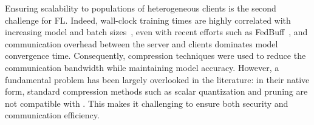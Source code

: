 Ensuring scalability to populations of heterogeneous clients is the second challenge for FL.
Indeed, wall-clock training times are highly correlated with increasing model and batch sizes~\citep{huba2021papaya}, even with recent efforts such as FedBuff~\citep{nguyen2021federated},
and communication overhead between the server and clients dominates model convergence time.
Consequently, compression techniques were used to reduce the communication bandwidth while maintaining model accuracy.
However, a fundamental problem has been largely overlooked in the literature: in their native form, standard compression methods such as scalar quantization and pruning are not compatible with \SecAgg. 
This makes it challenging to ensure both security and communication efficiency.


